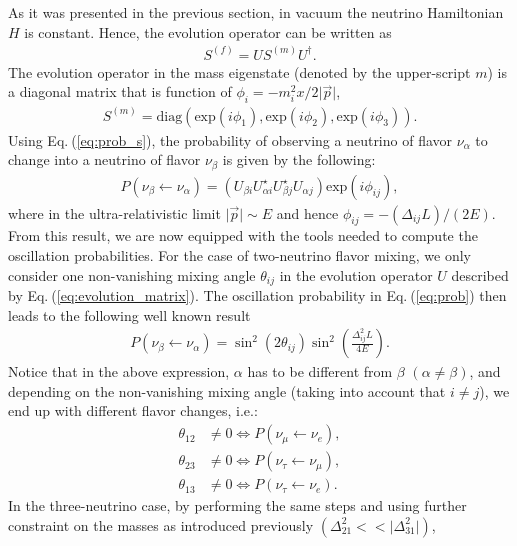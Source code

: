 \documentclass[twocolumn,secnumarabic,amssymb, nobibnotes, aps, prd,10pt]{revtex4-1}
\newcommand{\Eq}[1]{Eq.$\:$(\ref{#1})}
\begin{document}
As it was presented in the previous section, in vacuum the neutrino Hamiltonian $H$ is
constant. Hence, the evolution operator can be written as
\begin{align}
S^{(f)} = U S^{(m)} U^\dagger .
\end{align}
The evolution operator in the mass eigenstate (denoted by the upper-script $m$) is a 
diagonal matrix that is function of $\phi_i = -m_i^2 x / 2 \vert \vec{p} \vert$,
\begin{align}
S^{(m)} = \mathrm{diag} \left( \mathrm{exp}(i \phi_1), \mathrm{exp}(i \phi_2), 
\mathrm{exp}(i \phi_3) \right) .
\end{align}
Using \Eq{eq:prob_s}, the probability of observing a neutrino of flavor 
$\nu_\alpha$ to change into a neutrino of flavor $\nu_\beta$ is given by the following:
\begin{align}
P (\nu_\beta \longleftarrow \nu_\alpha) = \left( U_{\beta i} U^\star_{\alpha i} 
U^\star_{\beta j} U_{\alpha j} \right) \mathrm{exp}(i \phi_{ij}),
\label{eq:prob}
\end{align}
where in the ultra-relativistic limit $\vert \vec{p} \vert \sim E$ and hence
$\phi_{ij} = - \left( \Delta_{ij} L \right) / (2 E)$.
From this result, we are now equipped with the tools needed to compute the oscillation
probabilities. For the case of two-neutrino flavor mixing, we only consider one 
non-vanishing mixing angle $\theta_{ij}$ in the evolution operator $U$ described
by \Eq{eq:evolution_matrix}. The oscillation probability in \Eq{eq:prob} then leads
to the following well known result
\begin{align}
P (\nu_\beta \longleftarrow \nu_\alpha) = \sin^2 (2 \theta_{ij}) \sin^2 \left(
\frac{\Delta_{ij}^2 L}{4 E} \right) .
\label{eq:2OscProb}
\end{align}
Notice that in the above expression, $\alpha$ has to be different from $\beta$ 
$(\alpha \neq \beta)$, and depending on the non-vanishing mixing angle (taking into
account that $i \neq j$), we end up with different flavor changes, i.e.:
\begin{align}
\theta_{12} & \neq 0 \Longleftrightarrow P (\nu_\mu \longleftarrow \nu_e), \\
\theta_{23} & \neq 0 \Longleftrightarrow P (\nu_\tau \longleftarrow \nu_\mu), \\
\theta_{13} & \neq 0 \Longleftrightarrow P (\nu_\tau \longleftarrow \nu_e) .
\end{align}
In the three-neutrino case, by performing the same steps and using further constraint
on the masses as introduced previously $(\Delta_{21}^2 << \vert \Delta_{31}^2 \vert)$,
\end{document}
